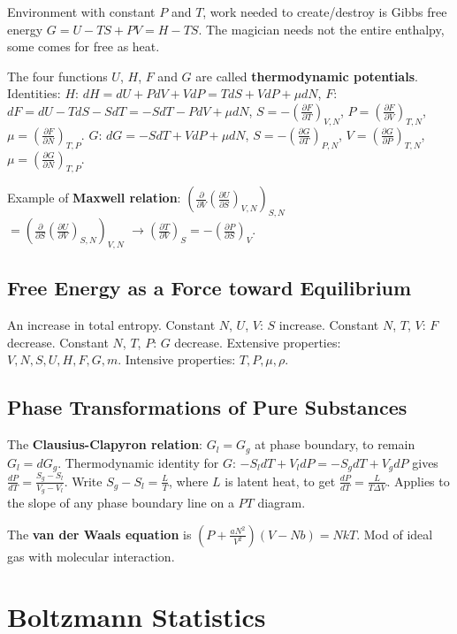 \documentclass[11pt,twocolumn]{amsart}
\begin{document}
Environment with constant $P$ and $T$, work needed to create/destroy is Gibbs free energy $G = U - TS + PV = H - TS$. The magician needs not the entire enthalpy, some comes for free as heat.

The four functions $U$, $H$, $F$ and $G$ are called \textbf{thermodynamic potentials}. Identities: $H$: $dH = dU + PdV + VdP = TdS + VdP + \mu dN$, $F$: $dF = dU - TdS - SdT = -SdT - PdV + \mu dN$, $S = -\left(\frac{\partial F}{\partial T} \right)_{V,N}$, $P = \left(\frac{\partial F}{\partial V} \right)_{T,N} $, $\mu = \left( \frac{\partial F}{\partial  N} \right)_{T,P} $. $G$: $dG = -SdT + VdP + \mu dN $, $S = - \left(\frac{\partial G}{\partial T} \right)_{P,N}$, $V = \left(\frac{\partial G}{\partial P} \right)_{T,N}$, $\mu = \left(\frac{\partial G}{\partial N} \right)_{T,P}$.

Example of \textbf{Maxwell relation}: $\left(\frac{\partial}{\partial V}\left(\frac{\partial U}{\partial S} \right)_{V,N} \right)_{S,N}$\\ $= \left(\frac{\partial}{\partial S}\left(\frac{\partial U}{\partial V} \right)_{S,N} \right)_{V,N}$ $\rightarrow \left(\frac{\partial T}{\partial V} \right)_S = - \left(\frac{\partial P}{\partial S} \right)_V$.

\subsection{Free Energy as a Force toward Equilibrium}
An increase in total entropy. Constant $N$, $U$, $V$: $S$ increase. Constant $N$, $T$, $V$: $F$ decrease. Constant $N$, $T$, $P$: $G$ decrease. Extensive properties: $V,N,S,U,H,F,G,m$. Intensive properties: $T,P,\mu, \rho$.

\subsection{Phase Transformations of Pure Substances}
The \textbf{Clausius-Clapyron relation}: $G_l = G_g$ at phase boundary, to remain $G_l = dG_g$. Thermodynamic identity for $G$:  $-S_ldT + V_ldP = -S_gdT + V_gdP$ gives $\frac{dP}{dT} = \frac{S_g-S_l}{V_g-V_l}$. Write $S_g-S_l = \frac{L}{T}$, where $L$ is latent heat, to get $\frac{dP}{dT} = \frac{L}{T\Delta V}$. Applies to the slope of any phase boundary line on a $PT$ diagram.

The \textbf{van der Waals equation} is $\left(P + \frac{aN^2}{V^2}\right)(V-Nb) = NkT$. Mod of ideal gas with molecular interaction.

\section{Boltzmann Statistics}
\end{document}
